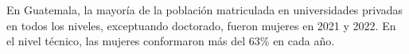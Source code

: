 En Guatemala, la mayoría de la población matriculada en universidades privadas en todos los niveles, exceptuando doctorado, fueron mujeres en 2021 y 2022. En el nivel técnico, las mujeres conformaron más del 63\% en cada año. 